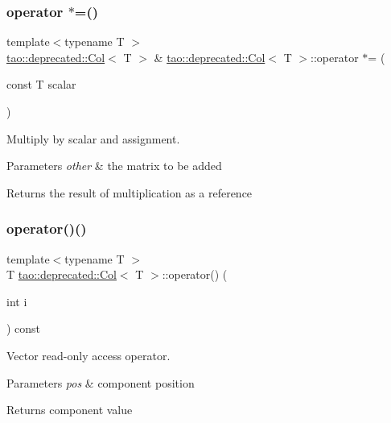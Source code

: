 \subsubsection{\texorpdfstring{operator $\ast$=()}{operator *=()}\hspace{0.1cm}{\footnotesize\ttfamily [2/2]}}
{\footnotesize\ttfamily template$<$typename T $>$ \\
\mbox{\hyperlink{classtao_1_1deprecated_1_1_col}{tao\+::deprecated\+::\+Col}}$<$ T $>$ \& \mbox{\hyperlink{classtao_1_1deprecated_1_1_col}{tao\+::deprecated\+::\+Col}}$<$ T $>$\+::operator $\ast$= (\begin{DoxyParamCaption}\item[{const T}]{scalar }\end{DoxyParamCaption})}



Multiply by scalar and assignment. 


\begin{DoxyParams}{Parameters}
{\em other} & the matrix to be added \\
\hline
\end{DoxyParams}
\begin{DoxyReturn}{Returns}
the result of multiplication as a reference 
\end{DoxyReturn}
\mbox{\label{classtao_1_1deprecated_1_1_col_a91cd4f8b512f2b982183ffca98b09a4e}} 
\subsubsection{\texorpdfstring{operator()()}{operator()()}\hspace{0.1cm}{\footnotesize\ttfamily [1/2]}}
{\footnotesize\ttfamily template$<$typename T $>$ \\
T \mbox{\hyperlink{classtao_1_1deprecated_1_1_col}{tao\+::deprecated\+::\+Col}}$<$ T $>$\+::operator() (\begin{DoxyParamCaption}\item[{int}]{i }\end{DoxyParamCaption}) const}



Vector read-\/only access operator. 


\begin{DoxyParams}{Parameters}
{\em pos} & component position \\
\hline
\end{DoxyParams}
\begin{DoxyReturn}{Returns}
component value 
\end{DoxyReturn}
\mbox{\label{classtao_1_1deprecated_1_1_col_a5095560139f140b6ebac8e1eb33442f2}} 
